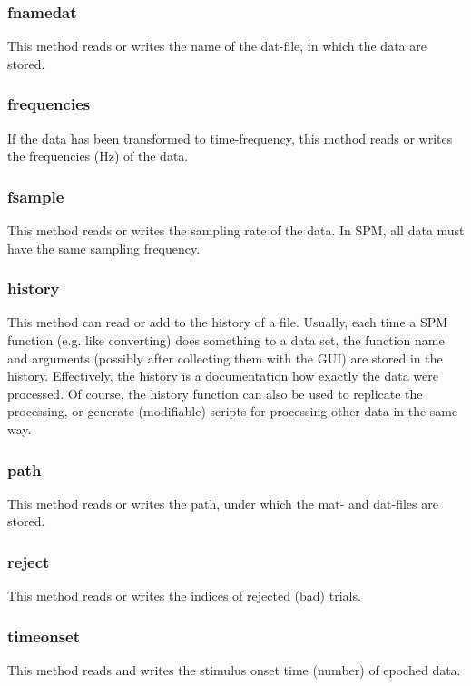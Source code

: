 \subsubsection{fnamedat}
This method reads or writes the name of the dat-file, in which the
data are stored. 

\subsubsection{frequencies}
If the data has been transformed to time-frequency, this method reads
or writes the frequencies (Hz) of the data.

\subsubsection{fsample}
This method reads or writes the sampling rate of the data. In SPM, all
data must have the same sampling frequency.


\subsubsection{history}
This method can read or add to the history of a file. Usually, each
time a SPM function (e.g. like converting) does something to a data
set, the function name and arguments (possibly after collecting them
with the GUI) are stored in the history. Effectively, the history is a
documentation how exactly the data were processed. Of course, the
history function can also be used to replicate the processing, or
generate (modifiable) scripts for processing other data in the same
way.

\subsubsection{path}
This method reads or writes the path, under which the mat- and
dat-files are stored. 

\subsubsection{reject}
This method reads or writes the indices of rejected (bad) trials.

\subsubsection{timeonset}
This method reads and writes the stimulus onset time (number) of
epoched data. 

